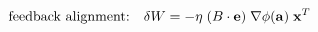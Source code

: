 \begin{equation}
\text{feedback alignment:} \quad \delta W = - \eta \;
(B \cdot \mathbf{e}) \;
\nabla \phi(\mathbf{a}) \;
\mathbf{x}^T\;\\
\end{equation}


%
